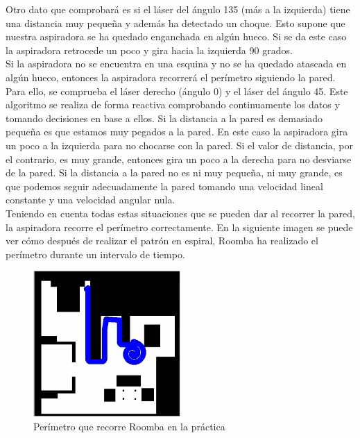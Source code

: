 Otro dato que comprobará es si el láser del ángulo 135 (más a la izquierda) tiene una distancia muy pequeña y además ha detectado un choque. Esto supone que nuestra aspiradora se ha quedado enganchada en algún hueco. Si se da este caso la aspiradora retrocede un poco y gira hacia la izquierda 90 grados.\\

Si la aspiradora no se encuentra en una esquina y no se ha quedado atascada en algún hueco, entonces la aspiradora recorrerá el perímetro siguiendo la pared. Para ello, se comprueba el láser derecho (ángulo 0) y el láser del ángulo 45. Este algoritmo se realiza de forma reactiva comprobando continuamente los datos y tomando decisiones en base a ellos. Si la distancia a la pared es demasiado pequeña es que estamos muy pegados a la pared. En este caso la aspiradora gira un poco a la izquierda para no chocarse con la pared. Si el valor de distancia, por el contrario, es muy grande, entonces gira un poco a la derecha para no desviarse de la pared. Si la distancia a la pared no es ni muy pequeña, ni muy grande, es que podemos seguir adecuadamente la pared tomando una velocidad lineal constante y una velocidad angular nula.\\

Teniendo en cuenta todas estas situaciones que se pueden dar al recorrer la pared, la aspiradora recorre el perímetro correctamente. En la siguiente imagen se puede ver cómo después de realizar el patrón en espiral, Roomba ha realizado el perímetro durante un intervalo de tiempo.\\

\begin{figure}[H]
  \begin{center}
    \includegraphics[width=0.5\textwidth]{figures/Vacuum/Perimetro_Roomba.png}
		\caption{Perímetro que recorre Roomba en la práctica}
		\label{fig.Perimetro_Roomba}
		\end{center}
\end{figure}

